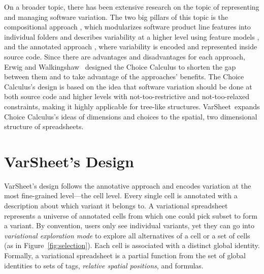 \documentclass[conference]{IEEEtran}
\newcommand{\varsheet}{VarSheet}
\begin{document}
On a broader topic, there has been extensive research on the topic of representing and managing software variation. The two big pillars of this topic
is the compositional approach \cite{KA08}, which modularizes software product line features \cite{CN01} into individual folders and
describes variability at a higher level using feature models \cite{Bat05}, and the annotated approach \cite{KA08}, where variability is encoded
and represented inside source code. Since there are advantages and disadvantages for each approach, Erwig and Walkingshaw~\cite{EW11tosem}
designed the Choice Calculus to shorten the gap between them and to take advantage of the approaches' benefits. The Choice Calculus's design
is based on the idea that software variation should be done at both source code and higher
levels with not-too-restrictive and not-too-relaxed constraints, making it highly
applicable for tree-like structures. \varsheet~expands Choice Calculus's ideas of dimensions
and choices to the spatial, two dimensional structure of spreadsheets.



\section{\varsheet's Design}
\label{sec:design}

\varsheet's design follows the annotative approach and encodes variation at the most fine-grained
level---the cell level. Every single cell is annotated with a description about which variant it belongs to.
A variational spreadsheet represents a universe of annotated cells from
which one could pick subset to form a variant.
By convention, users only see individual variants, yet they can go into
\emph{variational exploration mode} to explore all alternatives of a cell or a set of cells (as in Figure~\ref{fig:selection}).
Each cell is associated with a distinct global identity.
Formally, a variational spreadsheet is a partial function from the set of global identities to
sets of tags, \emph{relative spatial positions}, and formulas.
\end{document}
